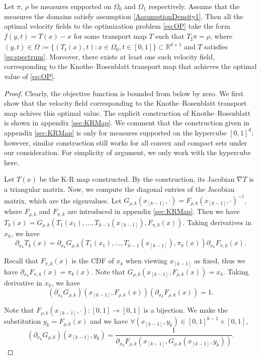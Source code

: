 \begin{theorem}\label{thm:ExistenceOfOptimalSolution}
Let $\pi$, $\rho$ be measures supported on $\Omega_0$ and $\Omega_1$ respectively. Assume that the measures the domains satisfy assumption \ref{AssumptionDensity1}. Then all the optimal velocity fields to the optimization problem \eqref{eq:OP} take the form $f(y,t) = T(x) - x$ for some transport map $T$ such that $T_\sharp\pi = \rho$, where $(y,t)\in\Omega:=\{(T_t(x),t):x\in\Omega_0,t\in[0,1]\}\subset \mathbb{R}^{d+1}$ and $T$ satisfies \eqref{eq:spectrum}. Moreover, there exists at least one such velocity field, corresponding to the Knothe--Rosenblatt transport map that achieves the optimal value of \eqref{eq:OP}.
\end{theorem}
\begin{proof}
Clearly, the objective function is bounded from below by zero. We first show that the velocity field corresponding to the Knothe--Rosenblatt transport map achives this optimal value. The explicit construction of Knothe--Rosenblatt is shown in appendix \ref{sec:KRMap}. We comment that the construction given in appendix \ref{sec:KRMap} is only for measures supported on the hypercube $[0,1]^d$; however, similar construction still works for all convex and compact sets under our consideration. For simplicity of argument, we only work with the hypercube here. 

Let $T(x)$ be the K-R map constructed. By the construction, its Jacobian $\nabla T$ is a triangular matrix. Now, we compute the diagonal entries of the Jacobian matrix, which are the eigenvalues. Let $G_{\rho, k}(x_{[k-1]}, \cdot) = F_{\rho,k}(x_{[k-1]}, \cdot)^{-1}$, where $F_{\rho,k}$ and $F_{\pi,k}$ are introduced in appendix \ref{sec:KRMap}.  Then we have $T_k(x) = G_{\rho, k}(T_1(x_1),...,T_{k-1}(x_{[k-1]}), F_{\pi, k}(x))$. Taking derivatives in $x_k$, we have 
$$\partial_{x_k}T_k(x) = \partial_{x_k}G_{\rho, k}(T_1(x_1),...,T_{k-1}(x_{[k-1]}), \pi_k(x))\partial_{x_k}F_{\pi,k}(x).$$

Recall that $F_{\pi,k}(x)$ is the CDF of $x_k$ when viewing $x_{[k-1]}$ as fixed, thus we have $\partial_{x_k}F_{\pi,k}(x) = \pi_k(x)$. Note that $G_{\rho,k}(x_{[k-1]}, F_{\rho,k}(x)) = x_k$. Taking derivative in $x_k$, we have 
$$(\partial_{x_k}G_{\rho,k})(x_{[k-1]}, F_{\rho,k}(x))(\partial_{x_k}F_{\rho,k}(x)) = 1.$$

Note that $F_{\rho,k}(x_{[k-1]}, \cdot):[0,1]\rightarrow[0,1]$ is a bijection. We make the substitution $y_k = F_{\rho,k}(x)$ and we have $\forall (x_{[k-1]}, y_k)\in[0,1]^{k-1}\times[0,1]$, 
$$(\partial_{x_k}G_{\rho,k})(x_{[k-1]}, y_k) = \frac{1}{\partial_{x_k}F_{\rho,k}(x_{[k-1]}, G_{\rho,k}(x_{[k-1]}, y_k))}.$$


\end{proof}
